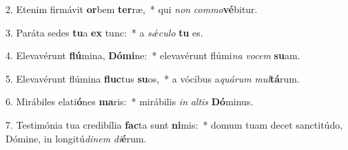 2. Etenim firmávit \textbf{or}bem \textbf{ter}ræ,~*  qui \textit{non} \textit{com}\textit{mo}\textbf{vé}bitur.\

3. Paráta sedes \textbf{tu}a \textbf{ex} tunc:~*  a \textit{sǽ}\textit{cu}\textit{lo} \textbf{tu} es.\

4. Elevavérunt \textbf{flú}mina, \textbf{Dó}\textbf{mi}ne:~*  elevavérunt flúmi\textit{na} \textit{vo}\textit{cem} \textbf{su}am.\

5. Elevavérunt flúmina \textbf{fluc}tus \textbf{su}os,~*  a vócibus a\textit{quá}\textit{rum} \textit{mul}\textbf{tá}rum.\

6. Mirábiles elati\textbf{ó}nes \textbf{ma}ris:~*  mirábilis \textit{in} \textit{al}\textit{tis} \textbf{Dó}minus.\

7. Testimónia tua credibília \textbf{fac}ta sunt \textbf{ni}mis:~*  domum tuam decet sanctitúdo, Dómine, in longitú\textit{di}\textit{nem} \textit{di}\textbf{é}rum.\

